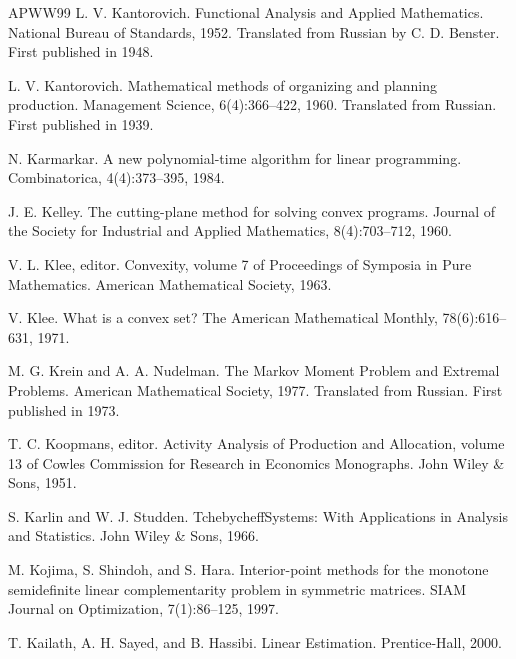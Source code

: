 \begin{thebibliography}{APWW99}
 L. V. Kantorovich. Functional Analysis and Applied Mathematics. National Bureau of Standards, 1952. Translated from Russian by C. D. Benster. First published in 1948.

 L. V. Kantorovich. Mathematical methods of organizing and planning production. Management Science, 6(4):366–422, 1960. Translated from Russian. First published in 1939.

 N. Karmarkar. A new polynomial-time algorithm for linear programming. Combinatorica, 4(4):373–395, 1984.

 J. E. Kelley. The cutting-plane method for solving convex programs. Journal of the Society for Industrial and Applied Mathematics, 8(4):703–712, 1960.

 V. L. Klee, editor. Convexity, volume 7 of Proceedings of Symposia in Pure Mathematics. American Mathematical Society, 1963.

 V. Klee. What is a convex set? The American Mathematical Monthly, 78(6):616–631, 1971.

 M. G. Krein and A. A. Nudelman. The Markov Moment Problem and Extremal Problems. American Mathematical Society, 1977. Translated from Russian. First published in 1973.

 T. C. Koopmans, editor. Activity Analysis of Production and Allocation, volume 13 of Cowles Commission for Research in Economics Monographs. John Wiley \& Sons, 1951.

 S. Karlin and W. J. Studden. TchebycheffSystems: With Applications in Analysis and Statistics. John Wiley \& Sons, 1966.

 M. Kojima, S. Shindoh, and S. Hara. Interior-point methods for the monotone semidefinite linear complementarity problem in symmetric matrices. SIAM Journal on Optimization, 7(1):86–125, 1997.

 T. Kailath, A. H. Sayed, and B. Hassibi. Linear Estimation. Prentice-Hall, 2000.


\end{thebibliography}
